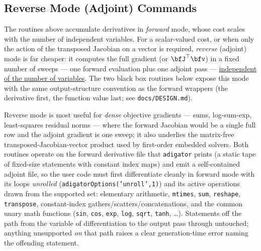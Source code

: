 \documentclass[10pt,pdftex]{article}
\begin{document}
\subsection{Reverse Mode (Adjoint) Commands}\label{SubSec:ReverseBlackBox}
The routines above accumulate derivatives in \emph{forward} mode, whose cost scales with the number of independent variables. For a scalar-valued cost, or when only the action of the transposed Jacobian on a vector is required, \emph{reverse} (adjoint) mode is far cheaper: it computes the full gradient (or $\bfJ^\top\bfv$) in a fixed number of sweeps --- one forward evaluation plus one adjoint pass --- \underline{independent of the number of variables}. The two black box routines below expose this mode with the same output-structure convention as the forward wrappers (the derivative first, the function value last; see \texttt{docs/DESIGN.md}).

Reverse mode is most useful for \emph{dense} objective gradients --- sums, log-sum-exp, least-squares residual norms --- where the forward Jacobian would be a single full row and the adjoint gradient is one sweep; it also underlies the matrix-free transposed-Jacobian-vector product used by first-order embedded solvers. Both routines operate on the forward derivative file that \texttt{adigator} prints (a static tape of fixed-size statements with constant index maps) and emit a self-contained adjoint file, so the user code must first differentiate cleanly in forward mode with its loops \emph{unrolled} (\texttt{adigatorOptions('unroll',1)}) and its active operations drawn from the supported set: elementary arithmetic, \texttt{mtimes}, \texttt{sum}, \texttt{reshape}, \texttt{transpose}, constant-index gathers/scatters/concatenations, and the common unary math functions (\texttt{sin}, \texttt{cos}, \texttt{exp}, \texttt{log}, \texttt{sqrt}, \texttt{tanh}, \dots). Statements off the path from the variable of differentiation to the output pass through untouched; anything unsupported \emph{on} that path raises a clear generation-time error naming the offending statement.
\end{document}
